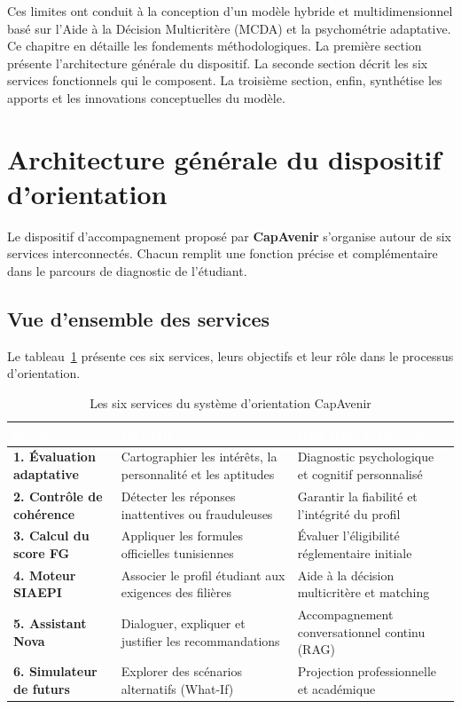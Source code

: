 Ces limites ont conduit à la conception d'un modèle hybride et multidimensionnel basé sur l'Aide à la Décision Multicritère (MCDA) et la psychométrie adaptative. Ce chapitre en détaille les fondements méthodologiques. La première section présente l'architecture générale du dispositif. La seconde section décrit les six services fonctionnels qui le composent. La troisième section, enfin, synthétise les apports et les innovations conceptuelles du modèle.

\section{Architecture générale du dispositif d'orientation}
\label{sec:architecture_conceptuelle}

Le dispositif d'accompagnement proposé par \textbf{CapAvenir} s'organise autour de six services interconnectés. Chacun remplit une fonction précise et complémentaire dans le parcours de diagnostic de l'étudiant.

\subsection{Vue d'ensemble des services}

Le tableau~\ref{tab:modules_ia} présente ces six services, leurs objectifs et leur rôle dans le processus d'orientation.

\begin{table}[H]
\centering
\small
\begin{tabular}{|p{4cm}|p{5.5cm}|p{5cm}|}
\hline
\rowcolor{headercolor} 
\textcolor{white}{\textbf{Service}} & \textcolor{white}{\textbf{Objectif}} & \textcolor{white}{\textbf{Rôle dans le parcours}} \\
\hline
\textbf{1. Évaluation adaptative} & Cartographier les intérêts, la personnalité et les aptitudes & Diagnostic psychologique et cognitif personnalisé \\
\hline
\rowcolor{rowgray}
\textbf{2. Contrôle de cohérence} & Détecter les réponses inattentives ou frauduleuses & Garantir la fiabilité et l'intégrité du profil \\
\hline
\textbf{3. Calcul du score FG} & Appliquer les formules officielles tunisiennes & Évaluer l'éligibilité réglementaire initiale \\
\hline
\rowcolor{rowgray}
\textbf{4. Moteur SIAEPI} & Associer le profil étudiant aux exigences des filières & Aide à la décision multicritère et matching \\
\hline
\textbf{5. Assistant Nova} & Dialoguer, expliquer et justifier les recommandations & Accompagnement conversationnel continu (RAG) \\
\hline
\rowcolor{rowgray}
\textbf{6. Simulateur de futurs} & Explorer des scénarios alternatifs (What-If) & Projection professionnelle et académique \\
\hline
\end{tabular}
\caption{Les six services du système d'orientation CapAvenir}
\label{tab:modules_ia}
\end{table}

